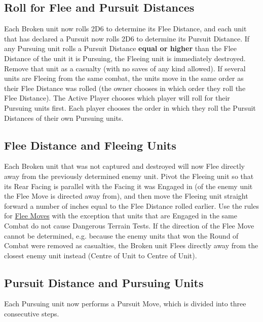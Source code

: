 \subsection{Roll for Flee and Pursuit Distances}

Each Broken unit now rolls 2D6 to determine its Flee Distance, and each unit that has declared a Pursuit now rolls 2D6 to determine its Pursuit Distance. If any Pursuing unit rolls a Pursuit Distance \textbf{equal or higher} than the Flee Distance of the unit it is Pursuing, the Fleeing unit is immediately destroyed. Remove that unit as a casualty (with no saves of any kind allowed). If several units are Fleeing from the same combat, the units move in the same order as their Flee Distance was rolled (the owner chooses in which order they roll the Flee Distance). The Active Player chooses which player will roll for their Pursuing units first. Each player chooses the order in which they roll the Pursuit Distances of their own Pursuing units.

\subsection{Flee Distance and Fleeing Units}

Each Broken unit that was not captured and destroyed will now Flee directly away from the previously determined enemy unit. Pivot the Fleeing unit so that its Rear Facing is parallel with the Facing it was Engaged in (of the enemy unit the Flee Move is directed away from), and then move the Fleeing unit straight forward a number of inches equal to the Flee Distance rolled earlier. Use the rules for \hyperref[flee_moves]{Flee Moves} with the exception that units that are Engaged in the same Combat do not cause Dangerous Terrain Tests.
If the direction of the Flee Move cannot be determined, e.g. because the enemy units that won the Round of Combat were removed as casualties, the Broken unit Flees directly away from the closest enemy unit instead (Centre of Unit to Centre of Unit).

\subsection{Pursuit Distance and Pursuing Units}
\label{pursuit_distance_and_pursuing_units}

Each Pursuing unit now performs a Pursuit Move, which is divided into three consecutive steps.

